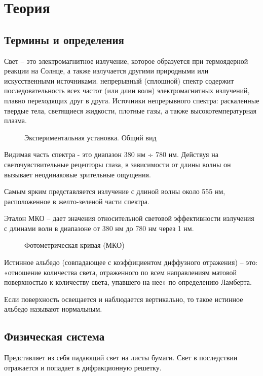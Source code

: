 \documentclass[a4paper,12pt]{article} %
\begin{document}
\section{Теория}

    \subsection{Термины и определения}
    Свет – это электромагнитное излучение, которое образуется при термоядерной реакции на Солнце, а также излучается другими природными или искусственными источниками.
     непрерывный (сплошной) спектр содержит последовательность всех частот (или длин волн) электромагнитных излучений, плавно переходящих друг в друга.
    Источники непрерывного спектра: раскаленные твердые тела, светящиеся жидкости, плотные газы, а также высокотемпературная плазма.
\begin{figure}[h]
                \caption{Экспериментальная установка. Общий вид}
\end{figure}
    \par Видимая часть спектра - это диапазон 380 нм ÷ 780 нм. Действуя на светочувствительные рецепторы глаза, в зависимости от длины волны он вызывает неодинаковые зрительные ощущения.
    \par Самым ярким представляется излучение с длиной волны около 555 нм, расположенное в желто-зеленой части спектра.
    \par Эталон МКО – дает значения относительной световой эффективности излучения с длинами волн в диапазоне от 380 нм до 780 нм через 1 нм.
    \begin{figure}[h]
                \caption{Фотометрическая кривая (МКО)}
\end{figure}
    \par Истинное альбедо (совпадающее с коэффициентом диффузного отражения) – это: «отношение количества света, отраженного по всем направлениям матовой поверхностью к количеству света, упавшего на нее» по определению Ламберта.
    \par Если поверхность освещается и наблюдается вертикально, то такое истинное альбедо называют нормальным.
    \subsection{Физическая система}
    Представляет из себя падающий свет на листы бумаги. Свет в последствии отражается и попадает в дифракционную решетку.
\end{document}
